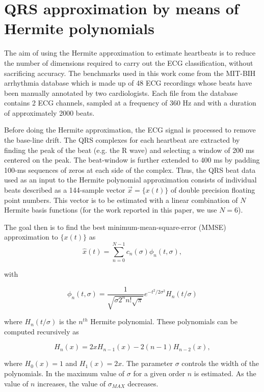 \documentclass[runningheads]{llncs}
\begin{document}
\section{QRS approximation by means of Hermite polynomials}\label{s:arr}

The aim of using the Hermite approximation to estimate heartbeats is to 
reduce the number of dimensions required to carry out the ECG classification, 
without sacrificing accuracy. 
The benchmarks used in this work come from the MIT-BIH arrhythmia database \cite{j:moody01} which is made up of 
48 ECG recordings whose beats  have been manually annotated by two cardiologists. 
Each file from the database 
contains 2 ECG channels, sampled at a frequency of 360 Hz and with a duration of approximately 2000 beats. 

Before doing the Hermite approximation, the ECG signal is processed to remove
the base-line drift.  The QRS complexes for each heartbeat are extracted by 
finding the peak of the beat (e.g. the R wave) and selecting a  window of 200 ms centered on the peak. 
The beat-window is further extended to 400 ms by padding 100-ms sequences of zeros at each side of the complex. 
Thus, the QRS beat data used as an input to the Hermite polynomial approximation
consists of individual beats described as a 144-sample vector $\vec{x}=\{x(t)\}$ of double
precision floating point numbers. 
This vector is to be estimated with a linear combination of $N$ Hermite basis functions (for
the work reported in this paper, we use $N=6$).

The goal then is to find the best minimum-mean-square-error (MMSE)  approximation to
$\{ x(t)\}$ as 
\begin{equation}\label{eqn:hat}
\hat{x}(t)=\sum_{n=0}^{N-1}c_n(\sigma )\phi_n(t,\sigma),
\end{equation}

\noindent with

\begin{equation}\label{eqn:phi}
\phi_n(t,\sigma )=\frac{1}{\sqrt{\sigma 2^n n!\sqrt{\pi}}}e^{-t^2/2\sigma^2}H_n(t/\sigma) 
\end{equation}

\noindent where $H_n(t/\sigma)$ is the $n^{th}$ Hermite polynomial. 
These polynomials can be computed recursively as

\begin{equation}
H_n(x)=2xH_{n-1}(x)-2(n-1)H_{n-2}(x),
\end{equation}

\noindent where $H_0(x)=1$ and $H_1(x)=2x$.
The parameter $\sigma$ controls the width of the polynomials. In \cite{j:lagerholm00} the maximum value 
of $\sigma$ for a given order $n$ is estimated.  As the value of $n$ increases, the value of $\sigma_{MAX}$ decreases.
\end{document}
